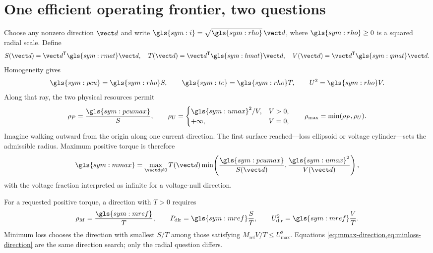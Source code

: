 \section{One efficient operating frontier, two questions}
\label{sec:frontier}

Choose any nonzero direction \(\vect d\) and write
\(\gls{sym:i}=\sqrt{\gls{sym:rho}}\,\vect d\), where
\(\gls{sym:rho}\geq0\) is a squared radial scale. Define
\begin{equation}
 S(\vect d)=\vect d^{\mathsf T}\gls{sym:rmat}\vect d,\quad
 T(\vect d)=\vect d^{\mathsf T}\gls{sym:hmat}\vect d,\quad
 V(\vect d)=\vect d^{\mathsf T}\gls{sym:qmat}\vect d.
\end{equation}
Homogeneity gives
\begin{equation}
 \gls{sym:pcu}=\gls{sym:rho}S,\qquad
 \gls{sym:te}=\gls{sym:rho}T,\qquad
 U^2=\gls{sym:rho}V.
 \label{eq:radial-separation}
\end{equation}
Along that ray, the two physical resources permit
\begin{equation}
 \rho_P=\frac{\gls{sym:pcumax}}{S},\qquad
 \rho_U=\begin{cases}\gls{sym:umax}^2/V,&V>0,\\+\infty,&V=0,\end{cases}
 \qquad \rho_{\max}=\min(\rho_P,\rho_U).
 \label{eq:radial-limits}
\end{equation}
Imagine walking outward from the origin along one current direction. The first
surface reached---loss ellipsoid or voltage cylinder---sets the admissible
radius. Maximum positive torque is therefore
\begin{equation}
 \gls{sym:mmax}=\max_{\vect d\neq0}T(\vect d)
 \min\!\left(\frac{\gls{sym:pcumax}}{S(\vect d)},
 \frac{\gls{sym:umax}^2}{V(\vect d)}\right),
 \label{eq:mmax-direction}
\end{equation}
with the voltage fraction interpreted as infinite for a voltage-null
direction.

For a requested positive torque, a direction with \(T>0\) requires
\begin{equation}
 \rho_M=\frac{\gls{sym:mref}}{T},\qquad
 P_{\mathrm{dir}}=\gls{sym:mref}\frac{S}{T},\qquad
 U_{\mathrm{dir}}^2=\gls{sym:mref}\frac{V}{T}.
 \label{eq:minloss-direction}
\end{equation}
Minimum loss chooses the direction with smallest \(S/T\) among those satisfying
\(M_{\mathrm{ref}}V/T\leq U_{\max}^2\). Equations
\cref{eq:mmax-direction,eq:minloss-direction} are the same direction search;
only the radial question differs.

